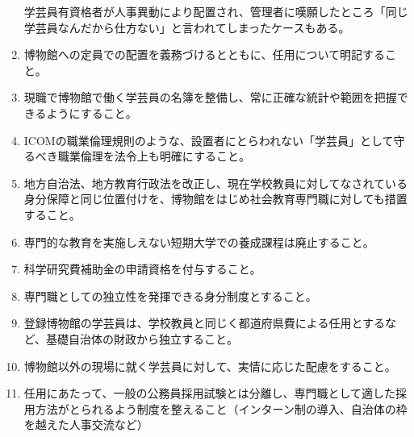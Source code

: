 \documentclass[12pt]{jsarticle}
\begin{document}
\begin{enumerate}
	学芸員有資格者が人事異動により配置され、管理者に嘆願したところ「同じ学芸員なんだから仕方ない」と言われてしまったケースもある。
	\item 博物館への定員での配置を義務づけるとともに、任用について明記すること。
	\item 現職で博物館で働く学芸員の名簿を整備し、常に正確な統計や範囲を把握できるようにすること。
	\item ICOMの職業倫理規則のような、設置者にとらわれない「学芸員」として守るべき職業倫理を法令上も明確にすること。
	\item 地方自治法、地方教育行政法を改正し、現在学校教員に対してなされている身分保障と同じ位置付けを、博物館をはじめ社会教育専門職に対しても措置すること。
	\item 専門的な教育を実施しえない短期大学での養成課程は廃止すること。
	\item 科学研究費補助金の申請資格を付与すること。
	\item 専門職としての独立性を発揮できる身分制度とすること。
	\item 登録博物館の学芸員は、学校教員と同じく都道府県費による任用とするなど、基礎自治体の財政から独立すること。
	\item 博物館以外の現場に就く学芸員に対して、実情に応じた配慮をすること。
	\item 任用にあたって、一般の公務員採用試験とは分離し、専門職として適した採用方法がとられるよう制度を整えること（インターン制の導入、自治体の枠を越えた人事交流など）
\end{enumerate}

\end{document}
